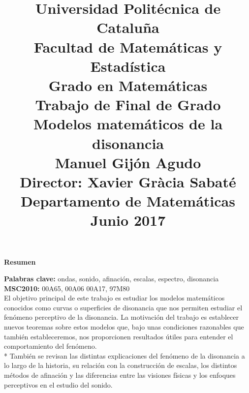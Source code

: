 \documentclass[11pt,a4paper]{article}
\title{ Universidad Politécnica de Cataluña\\
        \vspace{2.5mm}
        Facultad de Matemáticas y Estadística\\
        Grado en Matemáticas\\
        \vspace{2cm}
        \normalsize
        Trabajo de Final de Grado\\
        \vspace{2cm}
        \Huge
        \textbf{Modelos matemáticos de la disonancia}\\
        \vspace{1cm}
        \large
        Manuel Gijón Agudo\\
        \vspace{5cm}  
        Director: Xavier Gràcia Sabaté\\
        Departamento de Matemáticas\\ 
        \vspace{2cm}
        Junio 2017
    }
\date{} %
\begin{document}
\deactivatequoting



\clearpage\null\thispagestyle{empty}\newpage %


\maketitle{}
\thispagestyle{empty} %
\newpage

\clearpage\null\thispagestyle{empty}\newpage





\vspace{3cm}
\noindent\Large{\textbf{Resumen}}\\
\normalsize

\noindent\textbf{Palabras clave:} ondas, sonido, afinación, escalas, espectro, disonancia\\

\noindent\textbf{MSC2010:} 00A65, 00A06 00A17, 97M80\\ %


El objetivo principal de este trabajo es estudiar los modelos matemáticos conocidos como curvas o superficies de disonancia que nos permiten estudiar el fenómeno perceptivo de la disonancia. La motivación del trabajo es establecer nuevos teoremas sobre estos modelos que, bajo unas condiciones razonables que también estableceremos, nos proporcionen resultados útiles para entender el comportamiento del fenómeno.
\\*
También se revisan las distintas explicaciones del fenómeno de la disonancia a lo largo de la historia, su relación con la construcción de escalas, los distintos métodos de afinación y las diferencias entre las visiones físicas y los enfoques perceptivos en el estudio del sonido.
\end{document}
